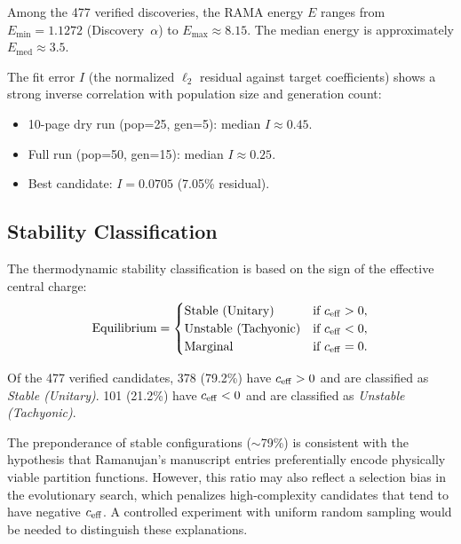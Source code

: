 \begin{proposition}
Among the 477 verified discoveries, the RAMA energy
$E$ ranges from $E_{\min} = 1.1272$ (Discovery~$\alpha$)
to $E_{\max} \approx 8.15$.  The median energy is
approximately $E_{\mathrm{med}} \approx 3.5$.
\end{proposition}

The fit error $I$ (the normalized $\ell_2$ residual
against target coefficients) shows a strong inverse
correlation with population size and generation count:
\begin{itemize}
  \item 10-page dry run (pop=25, gen=5): median $I \approx 0.45$.
  \item Full run (pop=50, gen=15): median $I \approx 0.25$.
  \item Best candidate: $I = 0.0705$ (7.05\% residual).
\end{itemize}

\subsection{Stability Classification}

The thermodynamic stability classification is based on
the sign of the effective central charge:
\begin{equation}
  \text{Equilibrium} =
  \begin{cases}
    \text{Stable (Unitary)} & \text{if } c_{\mathrm{eff}} > 0, \\
    \text{Unstable (Tachyonic)} & \text{if } c_{\mathrm{eff}} < 0, \\
    \text{Marginal} & \text{if } c_{\mathrm{eff}} = 0.
  \end{cases}
\end{equation}

\begin{proposition}
Of the 477 verified candidates, 378 (79.2\%) have
$c_{\mathrm{eff}} > 0$ and are classified as \emph{Stable (Unitary)}.
101 (21.2\%) have $c_{\mathrm{eff}} < 0$ and are classified as
\emph{Unstable (Tachyonic)}.
\end{proposition}

\begin{remark}
The preponderance of stable configurations ($\sim$79\%)
is consistent with the hypothesis that Ramanujan's
manuscript entries preferentially encode physically
viable partition functions.  However, this ratio
may also reflect a selection bias in the evolutionary
search, which penalizes high-complexity candidates
that tend to have negative $c_{\mathrm{eff}}$.  A controlled
experiment with uniform random sampling would be
needed to distinguish these explanations.
\end{remark}

